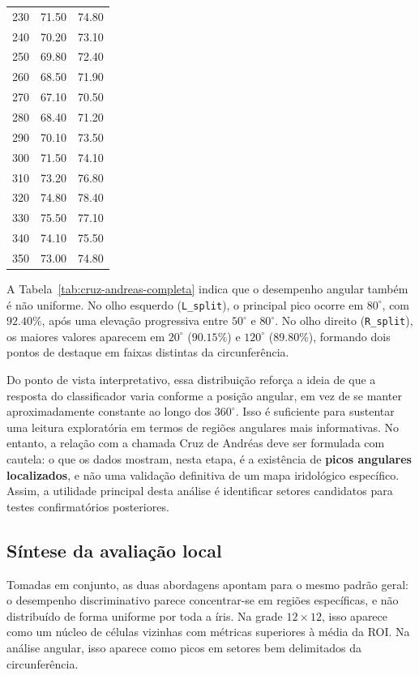\documentclass[12pt,a4paper]{article}
\begin{document}
\begin{table}[htbp]
\begin{tabular}{ccc}
230 & 71.50 & 74.80 \\
240 & 70.20 & 73.10 \\
250 & 69.80 & 72.40 \\
260 & 68.50 & 71.90 \\
270 & 67.10 & 70.50 \\
280 & 68.40 & 71.20 \\
290 & 70.10 & 73.50 \\
300 & 71.50 & 74.10 \\
310 & 73.20 & 76.80 \\
320 & 74.80 & 78.40 \\
330 & 75.50 & 77.10 \\
340 & 74.10 & 75.50 \\
350 & 73.00 & 74.80 \\
\bottomrule
\end{tabular}
\end{table}

A Tabela~\ref{tab:cruz-andreas-completa} indica que o desempenho angular também é não uniforme. No olho esquerdo (\texttt{L\_split}), o principal pico ocorre em \(80^\circ\), com \(92.40\%\), após uma elevação progressiva entre \(50^\circ\) e \(80^\circ\). No olho direito (\texttt{R\_split}), os maiores valores aparecem em \(20^\circ\) (\(90.15\%\)) e \(120^\circ\) (\(89.80\%\)), formando dois pontos de destaque em faixas distintas da circunferência.

Do ponto de vista interpretativo, essa distribuição reforça a ideia de que a resposta do classificador varia conforme a posição angular, em vez de se manter aproximadamente constante ao longo dos \(360^\circ\). Isso é suficiente para sustentar uma leitura exploratória em termos de regiões angulares mais informativas. No entanto, a relação com a chamada Cruz de Andréas deve ser formulada com cautela: o que os dados mostram, nesta etapa, é a existência de \textbf{picos angulares localizados}, e não uma validação definitiva de um mapa iridológico específico. Assim, a utilidade principal desta análise é identificar setores candidatos para testes confirmatórios posteriores.

\subsection{Síntese da avaliação local}
Tomadas em conjunto, as duas abordagens apontam para o mesmo padrão geral: o desempenho discriminativo parece concentrar-se em regiões específicas, e não distribuído de forma uniforme por toda a íris. Na grade \(12\times 12\), isso aparece como um núcleo de células vizinhas com métricas superiores à média da ROI. Na análise angular, isso aparece como picos em setores bem delimitados da circunferência.
\end{document}

